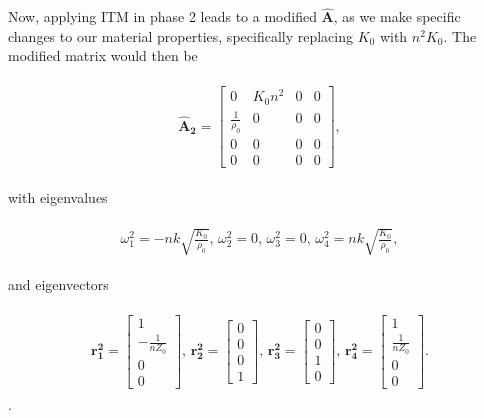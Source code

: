 Now, applying ITM in phase 2 leads to a modified $\mathbf{\hat{A}}$, as we make specific changes to our material properties, specifically replacing $K_0$ with $n^2K_0$. The modified matrix would then be

\begin{align}
    \begin{split}
    \mathbf{\hat{A}_2} = \begin{bmatrix}
        0 & K_{0} n^{2} & 0 & 0 \\
\frac{1}{\rho_{0}} & 0 & 0 & 0 \\
0 & 0 & 0 & 0 \\
0 & 0 & 0 & 0
    \end{bmatrix},
    \end{split}
\end{align}

with eigenvalues

\begin{align}
    \begin{split}
    \omega_1^2 = -n k \sqrt{\frac{K_{0}}{\rho_{0}}}, \,
    \omega_2^2 = 0, \,
    \omega_3^2 = 0, \,
    \omega_4^2 = n k \sqrt{\frac{K_{0}}{\rho_{0}}},
\end{split}
\end{align}

and eigenvectors

\begin{align}
    \begin{split}
    \mathbf{r_1^2} = \begin{bmatrix}
        1 \\
-\frac{1}{n Z_0} \\
0 \\
0
        \end{bmatrix}, \,
        \mathbf{r_2^2} = \begin{bmatrix}
            0 \\
0 \\
0 \\
1
            \end{bmatrix}, \,
            \mathbf{r_3^2} = \begin{bmatrix}
                0 \\
                0 \\
                1 \\
                0
                \end{bmatrix}, \,
                \mathbf{r_4^2} = \begin{bmatrix}
                    1 \\
                    \frac{1}{n Z_0} \\
                    0 \\
                    0                    
                \end{bmatrix}.
    \end{split}
\end{align} .

